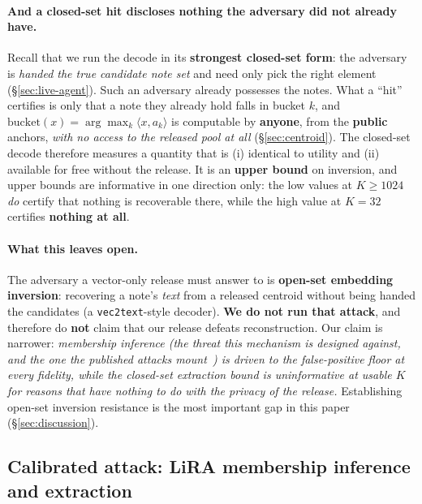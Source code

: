 \documentclass[pdflatex,sn-mathphys-num,12pt]{sn-jnl}
\theoremstyle{thmstyleone}%
\theoremstyle{thmstyletwo}%
\theoremstyle{thmstylethree}%
\newcommand{\secref}[1]{\S\ref{#1}}
\begin{document}
\paragraph{And a closed-set hit discloses nothing the adversary did not already have.} Recall
that we run the decode in its \textbf{strongest closed-set form}: the adversary is \emph{handed
the true candidate note set} and need only pick the right element (\secref{sec:live-agent}).
Such an adversary already possesses the notes. What a ``hit'' certifies is only that a note
they already hold falls in bucket $k$, and $\mathrm{bucket}(x) = \arg\max_k \langle x, a_k
\rangle$ is computable by \textbf{anyone}, from the \textbf{public} anchors, \emph{with no
access to the released pool at all} (\secref{sec:centroid}). The closed-set decode therefore
measures a quantity that is (i) identical to utility and (ii) available for free without the
release. It is an \textbf{upper bound} on inversion, and upper bounds are informative in one
direction only: the low values at $K \geq 1024$ \emph{do} certify that nothing is recoverable
there, while the high value at $K = 32$ certifies \textbf{nothing at all}.

\paragraph{What this leaves open.} The adversary a vector-only release must answer to is
\textbf{open-set embedding inversion}: recovering a note's \emph{text} from a released
centroid without being handed the candidates (a \texttt{vec2text}-style decoder). \textbf{We
do not run that attack}, and therefore do \textbf{not} claim that our release defeats
reconstruction. Our claim is narrower: \emph{membership inference (the threat this mechanism
is designed against, and the one the published attacks mount~\cite{chen2026mrmmia}) is driven
to the false-positive floor at every fidelity, while the closed-set extraction bound is
uninformative at usable $K$ for reasons that have nothing to do with the privacy of the
release.} Establishing open-set inversion resistance is the most important gap in this paper
(\secref{sec:discussion}).

\subsection{Calibrated attack: LiRA membership inference and
extraction}\label{sec:lira}
\end{document}
